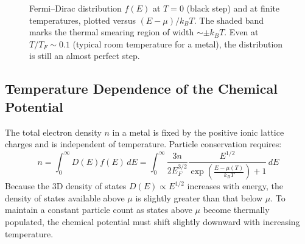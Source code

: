 \documentclass[11pt,a4paper]{article}
\begin{document}
\begin{figure}[h]
\centering
{}
\caption{Fermi--Dirac distribution $f(E)$ at $T=0$ (black step) and at finite temperatures, plotted versus $(E-\mu)/k_BT$. The shaded band marks the thermal smearing region of width $\sim \pm k_BT$. Even at $T/T_F\sim 0.1$ (typical room temperature for a metal), the distribution is still an almost perfect step.}
\label{fig:fermi_dirac}
\end{figure}

\subsection{Temperature Dependence of the Chemical Potential}
The total electron density $n$ in a metal is fixed by the positive ionic lattice charges and is independent of temperature. Particle conservation requires:
\begin{equation}
n = \int_0^\infty D(E) f(E)\,dE = \int_0^\infty \frac{3n}{2E_F^{3/2}} \frac{E^{1/2}}{\exp\left(\frac{E-\mu(T)}{k_B T}\right) + 1}\,dE
\label{eq:n_conservation}
\end{equation}
Because the 3D density of states $D(E) \propto E^{1/2}$ increases with energy, the density of states available above $\mu$ is slightly greater than that below $\mu$. To maintain a constant particle count as states above $\mu$ become thermally populated, the chemical potential must shift slightly downward with increasing temperature. 
\end{document}
